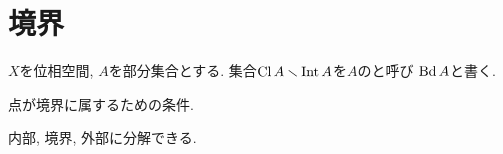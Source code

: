 \documentclass[uplatex, dvipdfmx, a4paper, 12pt, class=jsbook, crop=false]{standalone}
\begin{document}
\section{境界}
\label{sec:boundaries}

\begin{definition}
	$ X $を位相空間, $ A $を部分集合とする.
	集合$ \mathop{\mathrm{Cl}}\nolimits A \smallsetminus \mathop{\mathrm{Int}}\nolimits A $を$ A $のと呼び
	$ \mathop{\mathrm{Bd}}\nolimits A $と書く.
\end{definition}

\begin{proposition}
	点が境界に属するための条件.
\end{proposition}

\begin{proposition}
	内部, 境界, 外部に分解できる.
\end{proposition}
\end{document}
